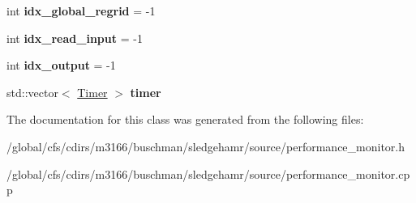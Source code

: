 \begin{DoxyCompactItemize}
int {\bfseries idx\+\_\+global\+\_\+regrid} = -\/1
\item 
\mbox{\label{classsledgehamr_1_1PerformanceMonitor_a7b3c0560372ca82bab55a19c448bf8c3}} 
int {\bfseries idx\+\_\+read\+\_\+input} = -\/1
\item 
\mbox{\label{classsledgehamr_1_1PerformanceMonitor_a37dbb0367878ad0b52b3920a5e2fbfba}} 
int {\bfseries idx\+\_\+output} = -\/1
\item 
\mbox{\label{classsledgehamr_1_1PerformanceMonitor_abd5c79180cec0b089826117fa710df4e}} 
std\+::vector$<$ \mbox{\hyperlink{classsledgehamr_1_1Timer}{Timer}} $>$ {\bfseries timer}
\end{DoxyCompactItemize}


The documentation for this class was generated from the following files\+:\begin{DoxyCompactItemize}
\item 
/global/cfs/cdirs/m3166/buschman/sledgehamr/source/performance\+\_\+monitor.\+h\item 
/global/cfs/cdirs/m3166/buschman/sledgehamr/source/performance\+\_\+monitor.\+cpp\end{DoxyCompactItemize}
